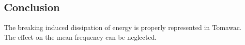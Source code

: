 \subsection{Conclusion}
The breaking induced dissipation of energy is properly represented in Tomawac.
The effect on the mean frequency can be neglected.



